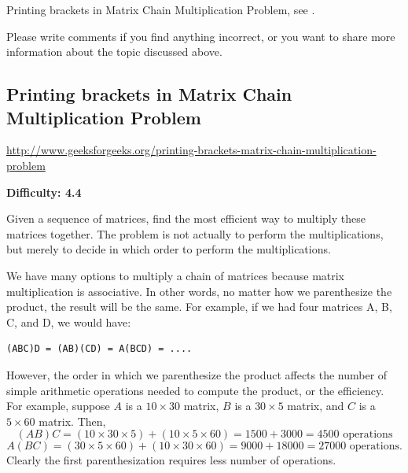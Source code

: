 Printing brackets in Matrix Chain Multiplication Problem, see
.

Please write comments if you find anything incorrect, or you want to share
more information about the topic discussed above.

\subsection{Printing brackets in Matrix Chain Multiplication Problem
  \label{secGFGDPPrintMatChainMult}}

\url{http://www.geeksforgeeks.org/printing-brackets-matrix-chain-multiplication-problem}

\textbf{Difficulty: 4.4}

Given a sequence of matrices, find the most efficient way to multiply these
matrices together. The problem is not actually to perform the
multiplications, but merely to decide in which order to perform the
multiplications.

We have many options to multiply a chain of matrices because matrix
multiplication is associative. In other words, no matter how we parenthesize
the product, the result will be the same. For example, if we had four
matrices A, B, C, and D, we would have:
\begin{lstlisting}[style=raygeneric]
    (ABC)D = (AB)(CD) = A(BCD) = ....
\end{lstlisting}
However, the order in which we parenthesize the product affects the number
of simple arithmetic operations needed to compute the product, or the
efficiency. For example, suppose $A$ is a $10\times30$ matrix, $B$ is a
$30\times5$ matrix, and $C$ is a $5\times60$ matrix. Then,
\begin{equation*}
(AB)C=(10\times30\times5)+(10\times5\times60)=1500+3000=4500
\text{ operations}
\end{equation*}
\begin{equation*}
A(BC)=(30\times5\times60)+(10\times30\times60)=9000+18000=27000 
\text{ operations}.
\end{equation*}
Clearly the first parenthesization requires less number of operations.

